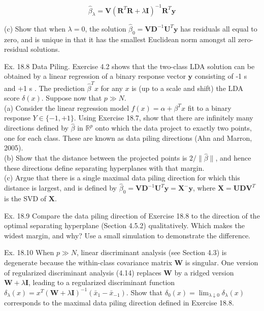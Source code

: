 \documentclass[10pt]{article}
\begin{document}
\begin{equation*}
\hat{\beta}_{\lambda}=\mathbf{V}\left(\mathbf{R}^{T} \mathbf{R}+\lambda \mathbf{I}\right)^{-1} \mathbf{R}^{T} \mathbf{y} \tag{18.56}
\end{equation*}


(c) Show that when $\lambda=0$, the solution $\hat{\beta}_{0}=\mathbf{V D}^{-1} \mathbf{U}^{T} \mathbf{y}$ has residuals all equal to zero, and is unique in that it has the smallest Euclidean norm amongst all zero-residual solutions.

Ex. 18.8 Data Piling. Exercise 4.2 shows that the two-class LDA solution can be obtained by a linear regression of a binary response vector $\mathbf{y}$ consisting of -1 s and +1 s . The prediction $\hat{\beta}^{T} x$ for any $x$ is (up to a scale and shift) the LDA score $\delta(x)$. Suppose now that $p \gg N$.\\
(a) Consider the linear regression model $f(x)=\alpha+\beta^{T} x$ fit to a binary response $Y \in\{-1,+1\}$. Using Exercise 18.7, show that there are infinitely many directions defined by $\hat{\beta}$ in $\mathbb{R}^{p}$ onto which the data project to exactly two points, one for each class. These are known as data piling directions (Ahn and Marron, 2005).\\
(b) Show that the distance between the projected points is $2 /\|\hat{\beta}\|$, and hence these directions define separating hyperplanes with that margin.\\
(c) Argue that there is a single maximal data piling direction for which this distance is largest, and is defined by $\hat{\beta}_{0}=\mathbf{V D}^{-1} \mathbf{U}^{T} \mathbf{y}=\mathbf{X}^{-} \mathbf{y}$, where $\mathbf{X}=\mathbf{U D V}^{T}$ is the SVD of $\mathbf{X}$.

Ex. 18.9 Compare the data piling direction of Exercise 18.8 to the direction of the optimal separating hyperplane (Section 4.5.2) qualitatively. Which makes the widest margin, and why? Use a small simulation to demonstrate the difference.

Ex. 18.10 When $p \gg N$, linear discriminant analysis (see Section 4.3) is degenerate because the within-class covariance matrix $\mathbf{W}$ is singular. One version of regularized discriminant analysis (4.14) replaces $\mathbf{W}$ by a ridged version $\mathbf{W}+\lambda \mathbf{I}$, leading to a regularized discriminant function $\delta_{\lambda}(x)= x^{T}(\mathbf{W}+\lambda \mathbf{I})^{-1}\left(\bar{x}_{1}-\bar{x}_{-1}\right)$. Show that $\delta_{0}(x)=\lim _{\lambda \downarrow 0} \delta_{\lambda}(x)$ corresponds to the maximal data piling direction defined in Exercise 18.8.
\end{document}
